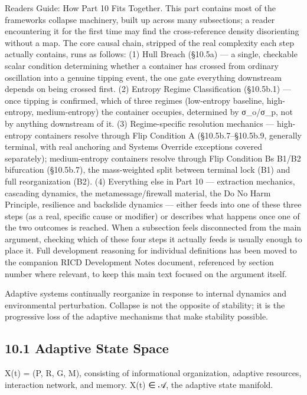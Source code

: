 \documentclass[
]{article}
\begin{document}
Reader\textquotesingle s Guide: How Part 10 Fits Together. This part
contains most of the framework\textquotesingle s collapse machinery,
built up across many subsections; a reader encountering it for the first
time may find the cross-reference density disorienting without a map.
The core causal chain, stripped of the real complexity each step
actually contains, runs as follows: (1) Hull Breach (§10.5a) --- a
single, checkable scalar condition determining whether a container has
crossed from ordinary oscillation into a genuine tipping event, the one
gate everything downstream depends on being crossed first. (2) Entropy
Regime Classification (§10.5b.1) --- once tipping is confirmed, which of
three regimes (low-entropy baseline, high-entropy, medium-entropy) the
container occupies, determined by σ\_o/σ\_p, not by anything downstream
of it. (3) Regime-specific resolution mechanics --- high-entropy
containers resolve through Flip Condition A (§10.5b.7--§10.5b.9,
generally terminal, with real anchoring and Systems Override exceptions
covered separately); medium-entropy containers resolve through Flip
Condition B\textquotesingle s B1/B2 bifurcation (§10.5b.7), the
mass-weighted split between terminal lock (B1) and full reorganization
(B2). (4) Everything else in Part 10 --- extraction mechanics, cascading
dynamics, the metamessage/firewall material, the Do No Harm Principle,
resilience and backslide dynamics --- either feeds into one of these
three steps (as a real, specific cause or modifier) or describes what
happens once one of the two outcomes is reached. When a subsection feels
disconnected from the main argument, checking which of these four steps
it actually feeds is usually enough to place it. Full development
reasoning for individual definitions has been moved to the companion
RICD Development Notes document, referenced by section number where
relevant, to keep this main text focused on the argument itself.

Adaptive systems continually reorganize in response to internal dynamics
and environmental perturbation. Collapse is not the opposite of
stability; it is the progressive loss of the adaptive mechanisms that
make stability possible.

\hypertarget{adaptive-state-space}{%
\subsection{10.1 Adaptive State Space}\label{adaptive-state-space}}

X(t) = (P, R, G, M), consisting of informational organization, adaptive
resources, interaction network, and memory. X(t) ∈ 𝒜, the adaptive state
manifold.
\end{document}
